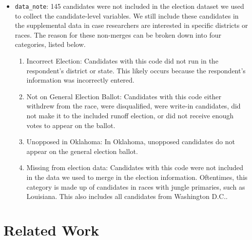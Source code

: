 \documentclass[12pt]{article}
\begin{document}
\begin{itemize}[leftmargin=*]
    \begin{tabularx}{\linewidth}{CCC}
     &  & 
    \end{tabularx}

    The set of tables below show the \emph{party} of the candidate that \emph{won}. 



    \begin{tabularx}{\linewidth}{CCC}
     &  & 
    \end{tabularx}


\item \texttt{data\_note}: 145 candidates were not included in the election dataset we used to collect the candidate-level variables. We still include these candidates in the supplemental data in case researchers are interested in specific districts or races. The reason for these non-merges can be broken down into four categories, listed below.
		\begin{enumerate}
			\item Incorrect Election: Candidates with this code  did not run in the respondent's district or state. This likely occurs because the respondent's information was incorrectly entered. 
			\item Not on General Election Ballot: Candidates with this code either withdrew from the race, were disqualified, were write-in candidates, did not make it to the included runoff election, or did not receive enough votes to appear on the ballot. 
			\item Unopposed in Oklahoma: In Oklahoma, unopposed candidates do not appear on the general election ballot. 
			\item Missing from election data: Candidates with this code were not included in the data we used to merge in the election information. Oftentimes, this category is made up of candidates in races with jungle primaries, such as Louisiana. This also includes all candidates from Washington D.C.. 
		\end{enumerate}
\end{itemize}
	



\section{Related Work}
\end{document}
